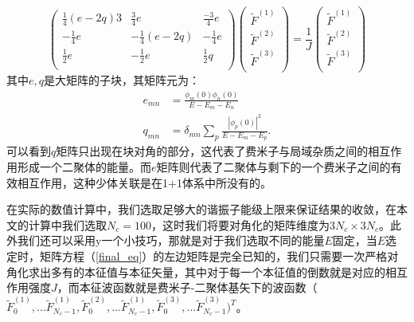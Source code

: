      \begin{equation}
      \left(
        \begin{array}{ccc}
        \frac{1}{4} (e-2 q) 3 & \frac{3}{4} e  & \frac{-3}{4}  e  \\
        -\frac{1}{4}e & -\frac{1}{4} (e-2 q) & -\frac{1}{4} e  \\
        \frac{1}{2} e  & -\frac{1}{2} e  & \frac{1}{2} q  \\
        \end{array}
      \right)
        \left(
            \begin{array}{c}
                \tilde{F}^{(1)} \\
                \tilde{F}^{(2)} \\
                \tilde{F}^{(3)} \\
            \end{array}
        \right)
        =\frac{1}{J}
        \left(
            \begin{array}{c}
                \tilde{F}^{(1)} \\
                \tilde{F}^{(2)} \\
                \tilde{F}^{(3)} \\
            \end{array}
        \right)   \label{final_eq}
    \end{equation}  
其中$e,q$是大矩阵的子块，其矩阵元为：
\begin{equation}
    \begin{split}
      e_{mn} &= \frac{\phi_m(0) \phi_n(0)}{E-E_m-E_n}\\
      q_{mn} &= \delta_{mn}  \sum_p \frac{|\phi_p(0)|^2}{E-E_m-E_p}.   
    \end{split}
\end{equation}
可以看到$q$矩阵只出现在块对角的部分，这代表了费米子与局域杂质之间的相互作用形成一个二聚体的能量。而$e$矩阵则代表了二聚体与剩下的一个费米子之间的有效相互作用，这种少体关联是在1+1体系中所没有的。

在实际的数值计算中，我们选取足够大的谐振子能级上限来保证结果的收敛，在本文的计算中我们选取$N_c=100$，这时我们将要对角化的矩阵维度为$3N_c\times 3N_c$。此外我们还可以采用y一个小技巧，那就是对于我们选取不同的能量$E$固定，当$E$选定时，矩阵方程（\ref{final_eq}）的左边矩阵是完全已知的，我们只需要一次严格对角化求出多有的本征值与本征矢量，其中对于每一个本征值的倒数就是对应的相互作用强度$J$，而本征波函数就是费米子-二聚体基矢下的波函数（$\tilde{F}^{(1)}_0,...\tilde{F}^{(1)}_{N_c-1},\tilde{F}^{(2)}_0,...\tilde{F}^{(1)}_{N_c-1},\tilde{F}^{(3)}_0,...\tilde{F}^{(3)}_{N_c-1})^T$。

